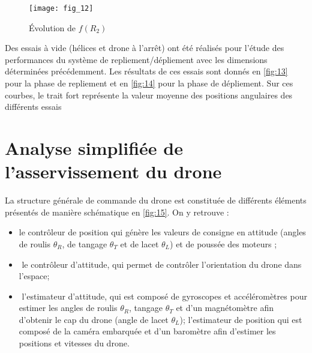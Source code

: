 \begin{figure}[H]
\centering
\texttt{[image: fig\_12]}
\caption{\label{fig:12} Évolution de $f(R_2)$}
\end{figure}

\ifprof
\begin{corrige}
\end{corrige}
\else
\fi

Des essais à vide (hélices et drone à l’arrêt) ont été réalisés pour l’étude des performances
du système de repliement/dépliement avec les dimensions déterminées précédemment. Les
résultats de ces essais sont donnés en \autoref{fig:13} pour la phase de repliement et en \autoref{fig:14}
pour la phase de dépliement. Sur ces courbes, le trait fort représente la valeur moyenne des
positions angulaires des différents essais

\ifprof
\begin{corrige}
\end{corrige}
\else
\fi

\ifprof
\begin{corrige}
\end{corrige}
\else
\fi

\section{\label{sec:03} Analyse simplifiée de l’asservissement du drone}

La structure générale de commande du drone est constituée de différents éléments présentés de manière schématique en \autoref{fig:15}. On y retrouve :
\begin{itemize}
\item le contrôleur de position qui génère les valeurs de consigne en attitude 
(angles de roulis $\theta_R$, 
de tangage $\theta_T$ 
et de lacet $\theta_L$)
et de poussée des moteurs ;
\item­ le contrôleur d’attitude, qui permet de contrôler l’orientation du drone dans l’espace;
\item­ l’estimateur d’attitude, qui est composé de gyroscopes et accéléromètres pour estimer
les angles de roulis $\theta_R$, tangage $\theta_T$ et d’un magnétomètre afin d’obtenir le cap du drone
(angle de lacet $\theta_L$);
­ l’estimateur de position qui est composé de la caméra embarquée et d’un baromètre
afin d’estimer les positions et vitesses du drone.
\end{itemize}

